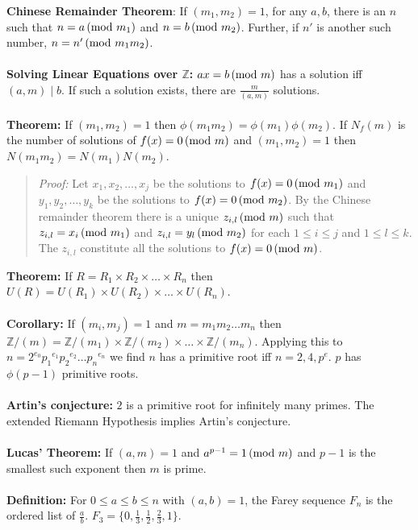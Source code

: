 {\bf Chinese Remainder Theorem}: If $(m_1 , m_2 )=1$, for any $a, b$,
there is an $n$ such that
$n= a \thinspace \textnormal{(mod } m_1 \textnormal{)}$ and
$n= b \thinspace \textnormal{(mod } m_2 \textnormal{)}$.  Further, if $n'$ is another such number,
$n= n' \thinspace \textnormal{(mod } m_1 m_2 \textnormal{)}$.
\\
\\
{\bf Solving Linear Equations over ${\mathbb Z}$:}
$ax=b \thinspace \textnormal{(mod } m \textnormal{)}$ has a solution iff $(a,m) \mid b$.  If such a solution exists,
there are ${\frac m {(a,m)}}$
solutions.
\\
\\
{\bf Theorem:} 
If $(m_1, m_2)=1$ then $\phi(m_1 m_2)= \phi(m_1) \phi(m_2)$.  If 
$N_f(m)$ is the number of solutions of $f(x) = 0 \thinspace \textnormal{(mod } m \textnormal{)}$ and $(m_1 , m_2)=1$
then $N(m_1 m_2) = N(m_1) N(m_2)$.
\begin{quote}
\emph{Proof:}
Let $x_1 , x_2 , \ldots , x_j$ be the solutions to $f(x) = 0 \thinspace \textnormal{(mod } m_1 \textnormal{)}$
and $y_1 , y_2 , \ldots , y_k$ be the solutions to $f(x) = 0 \thinspace \textnormal{(mod } m_2 \textnormal{)}$.
By the Chinese remainder theorem there is a unique $z_{i,l} \thinspace \textnormal{(mod } m \textnormal{)}$ such
that $z_{i,l} = x_i \thinspace \textnormal{(mod } m_1 \textnormal{)}$ and
$z_{i,l} = y_l \thinspace \textnormal{(mod } m_2 \textnormal{)}$ for each $1 \leq i \leq j$ and $1 \leq l \leq k$.
The $z_{i,l}$ constitute all the solutions to $f(x) = 0 \thinspace \textnormal{(mod } m \textnormal{)}$.
\end{quote}
{\bf Theorem:} 
If $R= R_1 \times R_2 \times \ldots \times R_n$ then
$U(R)= U(R_1) \times U(R_2) \times \ldots \times U(R_n)$. 
\\
\\
{\bf Corollary:} 
If $(m_i , m_j)=1$
and $m= m_1 m_2 \ldots m_n$ then
${\mathbb Z}/(m)= {\mathbb Z}/(m_1) \times {\mathbb Z}/(m_2) \times 
\ldots \times {\mathbb Z}/(m_n)$.  Applying this to
$n= 2^{e_0} {p_1}^{e_1}{p_2}^{e_2} \ldots {p_n}^{e_n}$ we find $n$ has a primitive root
iff $n= 2, 4, p^{e}$.  $p$ has $\phi(p-1)$ primitive roots.
\\
\\
{\bf Artin's conjecture:}
$2$ is a
primitive root for infinitely many primes.  The
extended Riemann Hypothesis implies Artin's
conjecture.
\\
\\
{\bf Lucas' Theorem:} If $(a,m)=1$ and $a^{p-1} = 1 \thinspace \textnormal{(mod } m \textnormal{)}$ and $p-1$
is the smallest such exponent then $m$ is prime.
\\
\\
{\bf Definition:} For $0 \leq a \leq b \leq n$ with $(a,b)=1$, the Farey sequence
$F_n$ is the ordered list of ${\frac a b}$.  $F_3= \{0, 
{\frac 1 3}, {\frac 1 2}, {\frac 2 3}, 1 \}$.
\\
\\
